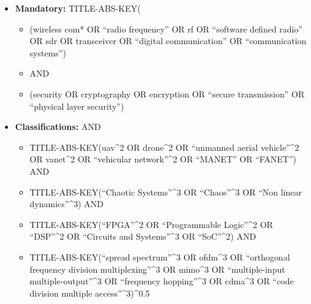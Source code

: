 \begin{itemize}
    \item \textbf{Mandatory:} TITLE-ABS-KEY(
    \begin{itemize}
        \item (wireless com* OR ``radio frequency'' OR rf OR ``software defined radio'' OR sdr OR transceiver OR ``digital communication'' OR ``communication systems'')
        \item AND
        \item (security OR cryptography OR encryption OR ``secure transmission'' OR ``physical layer security'')
    \end{itemize}
    \item \textbf{Classifications:} AND
    \begin{itemize}
        \item TITLE-ABS-KEY(uav\^{}2 OR drone\^{}2 OR ``unmanned aerial vehicle''\^{}2 OR vanet\^{}2 OR ``vehicular network''\^{}2 OR ``MANET'' OR ``FANET'') AND
        \item TITLE-ABS-KEY(``Chaotic Systems''\^{}3 OR ``Chaos''\^{}3 OR ``Non linear dynamics''\^{}3) AND
        \item TITLE-ABS-KEY(``FPGA''\^{}2 OR ``Programmable Logic''\^{}2 OR ``DSP''\^{}2 OR ``Circuits and Systems''\^{}3 OR ``SoC''\^{}2) AND
        \item TITLE-ABS-KEY(``spread spectrum''\^{}3 OR ofdm\^{}3 OR ``orthogonal frequency division multiplexing''\^{}3 OR mimo\^{}3 OR ``multiple-input multiple-output''\^{}3 OR ``frequency hopping''\^{}3 OR cdma\^{}3 OR ``code division multiple access''\^{}3)\^{}0.5
    \end{itemize}
\end{itemize}




